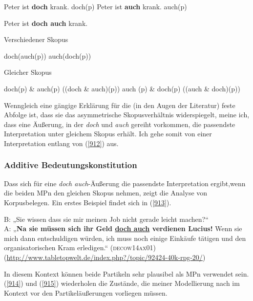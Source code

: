 {\begin{exe}
	\ex\label{909} 
		\begin{xlist}	
			\ex\label{909a} Peter ist \textbf{doch} krank. doch(p)
			\ex\label{909b} Peter ist \textbf{auch} krank. auch(p)
		\end{xlist}
\end{exe}

\begin{exe}
	\ex\label{910} 
		Peter ist \textbf{doch auch} krank.
\end{exe}
	
\begin{exe}
	\ex\label{911} Verschiedener Skopus\\[-1em]
		\begin{xlist}
			\ex\label{911a} doch(auch(p))
			\ex\label{911b} auch(doch(p))
		\end{xlist}
\end{exe}

\begin{exe}
	\ex\label{912} Gleicher Skopus\\[-1em]
		\begin{xlist} 	
			\ex\label{912a} doch(p) \& auch(p) ((doch \& auch)(p))
			\ex\label{912b} auch (p) \& doch(p)	((auch \& doch)(p)) 
		\end{xlist}
\end{exe}
Wenngleich eine gängige Erklärung für die (in den Augen der Literatur) feste Abfolge ist, dass sie das asymmetrische Skopusverhältnis  widerspiegelt, meine ich, dass eine Äußerung, in der \textit{doch} und \textit{auch} gereiht vorkommen, die passendste Interpretation unter gleichem Skopus erhält. Ich gehe somit von einer Interpretation entlang von (\ref{912}) aus.

\subsubsection{Additive Bedeutungskonstitution}
Dass sich für eine \textit{doch auch}-Äußerung die passendste Interpretation ergibt,\linebreak wenn die beiden MPn den gleichen Skopus nehmen, zeigt die Analyse von Korpusbelegen. Ein erstes Beispiel findet sich in (\ref{913}).

\begin{exe}
	\ex\label{913} 
	B: „Sie wissen dass sie mir meinen Job nicht gerade leicht machen?“\\
	A: „\textbf{Na sie müssen sich ihr Geld \ul{doch auch} verdienen Lucius!} Wenn sie mich dann entschuldigen würden, ich muss noch einige Einkäufe tätigen und den organisatorischen Kram erledigen.“
	\hbox{}\hfill\hbox{\scshape(decow14ax01)}
	\newline
	{\scriptsize(\url{http://www.tabletopwelt.de/index.php?/topic/92424-40k-rpg-20/})}
\end{exe}
In diesem Kontext können beide Partikeln sehr plausibel als MPn verwendet sein. (\ref{914}) und (\ref{915}) wiederholen die Zustände, die meiner Modellierung nach im Kontext vor den Partikeläußerungen vorliegen müssen.

}
